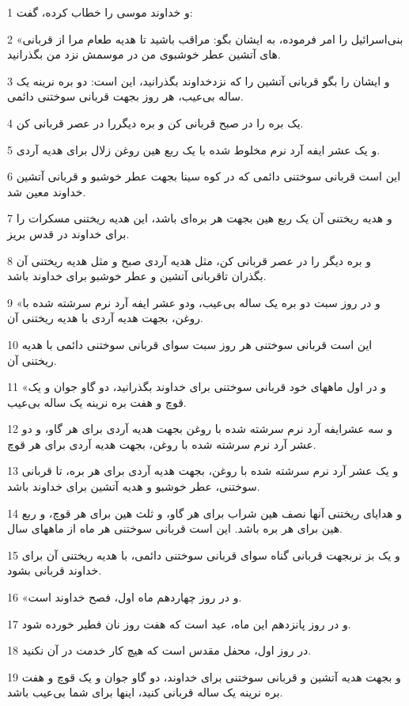 \par 1 و خداوند موسی را خطاب کرده، گفت:
\par 2 «بنی‌اسرائیل را امر فرموده، به ایشان بگو: مراقب باشید تا هدیه طعام مرا از قربانی های آتشین عطر خوشبوی من در موسمش نزد من بگذرانید.
\par 3 و ایشان را بگو قربانی آتشین را که نزدخداوند بگذرانید، این است: دو بره نرینه یک ساله بی‌عیب، هر روز بجهت قربانی سوختنی دائمی.
\par 4 یک بره را در صبح قربانی کن و بره دیگررا در عصر قربانی کن.
\par 5 و یک عشر ایفه آرد نرم مخلوط شده با یک ربع هین روغن زلال برای هدیه آردی.
\par 6 این است قربانی سوختنی دائمی که در کوه سینا بجهت عطر خوشبو و قربانی آتشین خداوند معین شد.
\par 7 و هدیه ریختنی آن یک ربع هین بجهت هر بره‌ای باشد، این هدیه ریختنی مسکرات را برای خداوند در قدس بریز.
\par 8 و بره دیگر را در عصر قربانی کن، مثل هدیه آردی صبح و مثل هدیه ریختنی آن بگذران تاقربانی آتشین و عطر خوشبو برای خداوند باشد.
\par 9 «و در روز سبت دو بره یک ساله بی‌عیب، ودو عشر ایفه آرد نرم سرشته شده با روغن، بجهت هدیه آردی با هدیه ریختنی آن.
\par 10 این است قربانی سوختنی هر روز سبت سوای قربانی سوختنی دائمی با هدیه ریختنی آن.
\par 11 «و در اول ماههای خود قربانی سوختنی برای خداوند بگذرانید، دو گاو جوان و یک قوچ و هفت بره نرینه یک ساله بی‌عیب.
\par 12 و سه عشرایفه آرد نرم سرشته شده با روغن بجهت هدیه آردی برای هر گاو، و دو عشر آرد نرم سرشته شده با روغن، بجهت هدیه آردی برای هر قوچ.
\par 13 و یک عشر آرد نرم سرشته شده با روغن، بجهت هدیه آردی برای هر بره، تا قربانی سوختنی، عطر خوشبو و هدیه آتشین برای خداوند باشد.
\par 14 و هدایای ریختنی آنها نصف هین شراب برای هر گاو، و ثلث هین برای هر قوچ، و ربع هین برای هر بره باشد. این است قربانی سوختنی هر ماه از ماههای سال.
\par 15 و یک بز نربجهت قربانی گناه سوای قربانی سوختنی دائمی، با هدیه ریختنی آن برای خداوند قربانی بشود.
\par 16 «و در روز چهاردهم ماه اول، فصح خداوند است.
\par 17 و در روز پانزدهم این ماه، عید است که هفت روز نان فطیر خورده شود.
\par 18 در روز اول، محفل مقدس است که هیچ کار خدمت در آن نکنید.
\par 19 و بجهت هدیه آتشین و قربانی سوختنی برای خداوند، دو گاو جوان و یک قوچ و هفت بره نرینه یک ساله قربانی کنید، اینها برای شما بی‌عیب باشد.
